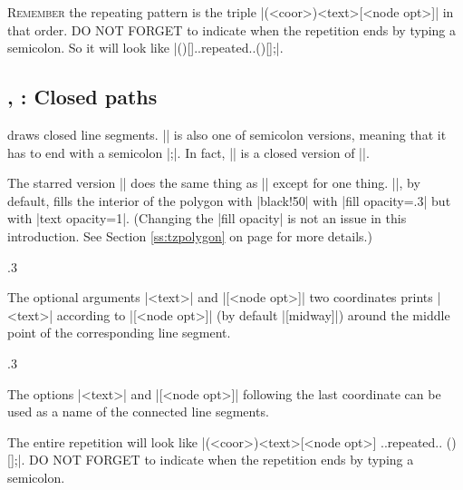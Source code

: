 \textsc{Remember} the repeating pattern is the triple |(<coor>){<text>}[<node opt>]| in that order.
DO NOT FORGET to indicate when the repetition ends by typing a semicolon. So it will look like |(){}[]..repeated..(){}[];|.

\subsection{\protect\cmd{\tzpolygon}, \protect\cmd{\tzpolygon*}: Closed paths}
\label{ssi:tzpolygon}

\icmd{\tzpolygon} draws closed line segments. |\tzpolygon| is also one of semicolon versions, meaning that it has to end with a semicolon |;|.
In fact, |\tzpolygon| is a closed version of |\tzlines|.

The starred version |\tzpolygon*| does the same thing as |\tzpolygon| except for one thing.
|\tzpolygon*|, by default, fills the interior of the polygon with |black!50| with |fill opacity=.3| but with |text opacity=1|. (Changing the |fill opacity| is not an issue in this introduction. See Section \ref{ss:tzpolygon} on page \pageref{ss:tzpolygon} for more details.) 

\begin{tzcode}{.3}
\end{tzcode}

The optional arguments |{<text>}| and |[<node opt>]|  two coordinates prints |<text>| according to |[<node opt>]| (by default |[midway]|) around the middle point of the corresponding line segment.

\begin{tzcode}{.3}
\end{tzcode}

The options |{<text>}| and |[<node opt>]| following the last coordinate can be used as a name of the connected line segments. 

The entire repetition will look like |(<coor>){<text>}[<node opt>] ..repeated.. (){}[];|.
DO NOT FORGET to indicate when the repetition ends by typing a semicolon.

